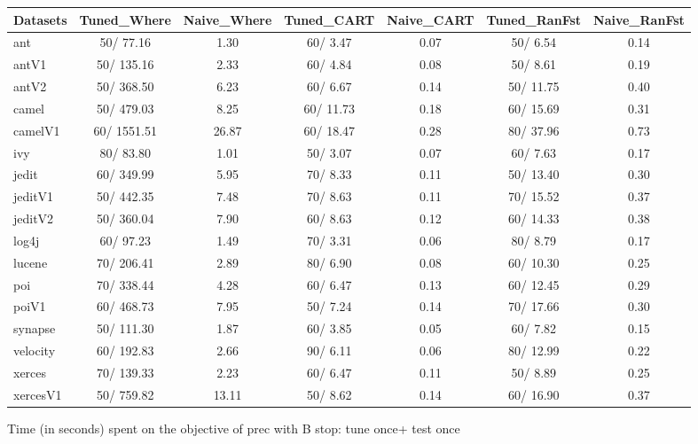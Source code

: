 \documentclass{acm_proc_article-sp}
\begin{document}
\begin{figure*}[!ht]
\scriptsize
\centering
  \begin{tabular}{l|c |c |c |c |c |c }
    \hline\hline
    Datasets & Tuned\_Where & Naive\_Where & Tuned\_CART & Naive\_CART & Tuned\_RanFst & Naive\_RanFst\\
    \hline
    ant & 50/ 77.16 & 1.30 & 60/ 3.47 & 0.07 & 50/ 6.54 & 0.14\\
    antV1 & 50/ 135.16 & 2.33 & 60/ 4.84 & 0.08 & 50/ 8.61 & 0.19\\
    antV2 & 50/ 368.50 & 6.23 & 60/ 6.67 & 0.14 & 50/ 11.75 & 0.40\\
    camel & 50/ 479.03 & 8.25 & 60/ 11.73 & 0.18 & 60/ 15.69 & 0.31\\
    camelV1 & 60/ 1551.51 & 26.87 & 60/ 18.47 & 0.28 & 80/ 37.96 & 0.73\\
    ivy & 80/ 83.80 & 1.01 & 50/ 3.07 & 0.07 & 60/ 7.63 & 0.17\\
    jedit & 60/ 349.99 & 5.95 & 70/ 8.33 & 0.11 & 50/ 13.40 & 0.30\\
    jeditV1 & 50/ 442.35 & 7.48 & 70/ 8.63 & 0.11 & 70/ 15.52 & 0.37\\
    jeditV2 & 50/ 360.04 & 7.90 & 60/ 8.63 & 0.12 & 60/ 14.33 & 0.38\\
    log4j & 60/ 97.23 & 1.49 & 70/ 3.31 & 0.06 & 80/ 8.79 & 0.17\\
    lucene & 70/ 206.41 & 2.89 & 80/ 6.90 & 0.08 & 60/ 10.30 & 0.25\\
    poi & 70/ 338.44 & 4.28 & 60/ 6.47 & 0.13 & 60/ 12.45 & 0.29\\
    poiV1 & 60/ 468.73 & 7.95 & 50/ 7.24 & 0.14 & 70/ 17.66 & 0.30\\
    synapse & 50/ 111.30 & 1.87 & 60/ 3.85 & 0.05 & 60/ 7.82 & 0.15\\
    velocity & 60/ 192.83 & 2.66 & 90/ 6.11 & 0.06 & 80/ 12.99 & 0.22\\
    xerces & 70/ 139.33 & 2.23 & 60/ 6.47 & 0.11 & 50/ 8.89 & 0.25\\
    xercesV1 & 50/ 759.82 & 13.11 & 50/ 8.62 & 0.14 & 60/ 16.90 & 0.37\\
  \end{tabular}
  \caption{Time (in seconds) spent on the objective of prec with B stop: tune once+ test once}
\end{figure*}
\end{document}
